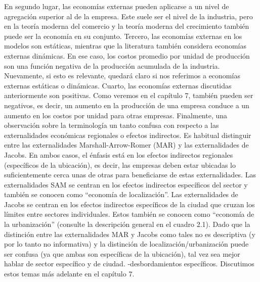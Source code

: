 En segundo lugar, las economías externas pueden aplicarse a un nivel de agregación superior al de la empresa. Este suele ser el nivel de la industria, pero en la teoría moderna del comercio y la teoría moderna del crecimiento también puede ser la economía en su conjunto. Tercero, las economías externas en los modelos son estáticas, mientras que la literatura también considera economías externas dinámicas. En ese caso, los costos promedio por unidad de producción son una función negativa de la producción acumulada de la industria. Nuevamente, si esto es relevante, quedará claro si nos referimos a economías externas estáticas o dinámicas. Cuarto, las economías externas discutidas anteriormente son positivas. Como veremos en el capítulo 7, también pueden ser negativos, es decir, un aumento en la producción de una empresa conduce a un aumento en los costos por unidad para otras empresas. Finalmente, una observación sobre la terminología un tanto confusa con respecto a las externalidades económicas regionales o efectos indirectos. Es habitual distinguir entre las externalidades Marshall-Arrow-Romer (MAR) y las externalidades de Jacobs. En ambos casos, el énfasis está en los efectos indirectos regionales (específicos de la ubicación), es decir, las empresas deben estar ubicadas lo suficientemente cerca unas de otras para beneficiarse de estas externalidades. Las externalidades SAM se centran en los efectos indirectos específicos del sector y también se conocen como “economía de localización”. Las externalidades de Jacobs se centran en los efectos indirectos específicos de la ciudad que cruzan los límites entre sectores individuales. Estos también se conocen como “economía de la urbanización” (consulte la descripción general en el cuadro 2.1). Dado que la distinción entre las externalidades MAR y Jacobs como tales no es descriptiva (y por lo tanto no informativa) y la distinción de localización/urbanización puede ser confusa (ya que ambas son específicas de la ubicación), tal vez sea mejor hablar de sector específico y de ciudad. -desbordamientos específicos. Discutimos estos temas más adelante en el capítulo 7.

